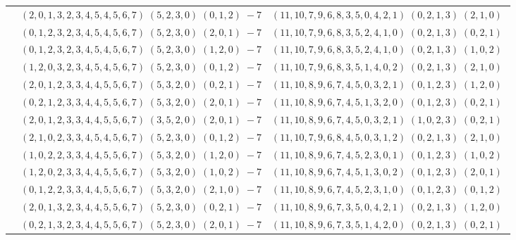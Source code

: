 \documentclass[11pt]{article}
\begin{document}
\begin{longtable}[l]{|c|c|c|}
 \cline{2-3} 
 & $(2 ,0 ,1 ,3 ,2 ,3 ,4 ,5 ,4 ,5 ,6 ,7) \;(5 ,2 ,3 ,0) \;(0 ,1 ,2) \;-7$ & $(11 ,10 ,7 ,9 ,6 ,8 ,3 ,5 ,0 ,4 ,2 ,1) \;(0 ,2 ,1 ,3) \;(2 ,1 ,0) \;$\\ 
 \cline{2-3} 
 & $(0 ,1 ,2 ,3 ,2 ,3 ,4 ,5 ,4 ,5 ,6 ,7) \;(5 ,2 ,3 ,0) \;(2 ,0 ,1) \;-7$ & $(11 ,10 ,7 ,9 ,6 ,8 ,3 ,5 ,2 ,4 ,1 ,0) \;(0 ,2 ,1 ,3) \;(0 ,2 ,1) \;$\\ 
 \cline{2-3} 
 & $(0 ,1 ,2 ,3 ,2 ,3 ,4 ,5 ,4 ,5 ,6 ,7) \;(5 ,2 ,3 ,0) \;(1 ,2 ,0) \;-7$ & $(11 ,10 ,7 ,9 ,6 ,8 ,3 ,5 ,2 ,4 ,1 ,0) \;(0 ,2 ,1 ,3) \;(1 ,0 ,2) \;$\\ 
 \cline{2-3} 
 & $(1 ,2 ,0 ,3 ,2 ,3 ,4 ,5 ,4 ,5 ,6 ,7) \;(5 ,2 ,3 ,0) \;(0 ,1 ,2) \;-7$ & $(11 ,10 ,7 ,9 ,6 ,8 ,3 ,5 ,1 ,4 ,0 ,2) \;(0 ,2 ,1 ,3) \;(2 ,1 ,0) \;$\\ 
 \cline{2-3} 
 & $(2 ,0 ,1 ,2 ,3 ,3 ,4 ,4 ,5 ,5 ,6 ,7) \;(5 ,3 ,2 ,0) \;(0 ,2 ,1) \;-7$ & $(11 ,10 ,8 ,9 ,6 ,7 ,4 ,5 ,0 ,3 ,2 ,1) \;(0 ,1 ,2 ,3) \;(1 ,2 ,0) \;$\\ 
 \cline{2-3} 
 & $(0 ,2 ,1 ,2 ,3 ,3 ,4 ,4 ,5 ,5 ,6 ,7) \;(5 ,3 ,2 ,0) \;(2 ,0 ,1) \;-7$ & $(11 ,10 ,8 ,9 ,6 ,7 ,4 ,5 ,1 ,3 ,2 ,0) \;(0 ,1 ,2 ,3) \;(0 ,2 ,1) \;$\\ 
 \cline{2-3} 
 & $(2 ,0 ,1 ,2 ,3 ,3 ,4 ,4 ,5 ,5 ,6 ,7) \;(3 ,5 ,2 ,0) \;(2 ,0 ,1) \;-7$ & $(11 ,10 ,8 ,9 ,6 ,7 ,4 ,5 ,0 ,3 ,2 ,1) \;(1 ,0 ,2 ,3) \;(0 ,2 ,1) \;$\\ 
 \cline{2-3} 
 & $(2 ,1 ,0 ,2 ,3 ,3 ,4 ,5 ,4 ,5 ,6 ,7) \;(5 ,2 ,3 ,0) \;(0 ,1 ,2) \;-7$ & $(11 ,10 ,7 ,9 ,6 ,8 ,4 ,5 ,0 ,3 ,1 ,2) \;(0 ,2 ,1 ,3) \;(2 ,1 ,0) \;$\\ 
 \cline{2-3} 
 & $(1 ,0 ,2 ,2 ,3 ,3 ,4 ,4 ,5 ,5 ,6 ,7) \;(5 ,3 ,2 ,0) \;(1 ,2 ,0) \;-7$ & $(11 ,10 ,8 ,9 ,6 ,7 ,4 ,5 ,2 ,3 ,0 ,1) \;(0 ,1 ,2 ,3) \;(1 ,0 ,2) \;$\\ 
 \cline{2-3} 
 & $(1 ,2 ,0 ,2 ,3 ,3 ,4 ,4 ,5 ,5 ,6 ,7) \;(5 ,3 ,2 ,0) \;(1 ,0 ,2) \;-7$ & $(11 ,10 ,8 ,9 ,6 ,7 ,4 ,5 ,1 ,3 ,0 ,2) \;(0 ,1 ,2 ,3) \;(2 ,0 ,1) \;$\\ 
 \cline{2-3} 
 & $(0 ,1 ,2 ,2 ,3 ,3 ,4 ,4 ,5 ,5 ,6 ,7) \;(5 ,3 ,2 ,0) \;(2 ,1 ,0) \;-7$ & $(11 ,10 ,8 ,9 ,6 ,7 ,4 ,5 ,2 ,3 ,1 ,0) \;(0 ,1 ,2 ,3) \;(0 ,1 ,2) \;$\\ 
 \cline{2-3} 
 & $(2 ,0 ,1 ,3 ,2 ,3 ,4 ,4 ,5 ,5 ,6 ,7) \;(5 ,2 ,3 ,0) \;(0 ,2 ,1) \;-7$ & $(11 ,10 ,8 ,9 ,6 ,7 ,3 ,5 ,0 ,4 ,2 ,1) \;(0 ,2 ,1 ,3) \;(1 ,2 ,0) \;$\\ 
 \cline{2-3} 
 & $(0 ,2 ,1 ,3 ,2 ,3 ,4 ,4 ,5 ,5 ,6 ,7) \;(5 ,2 ,3 ,0) \;(2 ,0 ,1) \;-7$ & $(11 ,10 ,8 ,9 ,6 ,7 ,3 ,5 ,1 ,4 ,2 ,0) \;(0 ,2 ,1 ,3) \;(0 ,2 ,1) \;$\\ 

\end{longtable}
\end{document}
